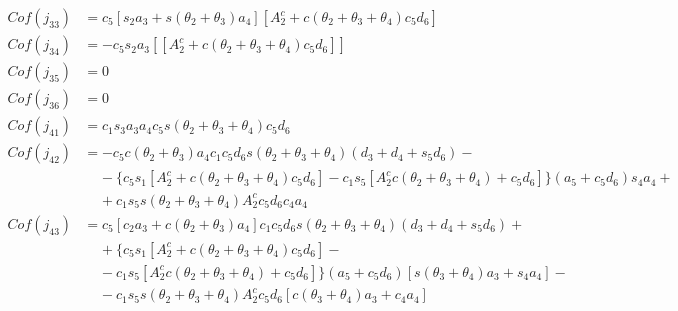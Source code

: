 \begin{align*}
    Cof(j_{33}) &= c_5[s_2a_3+s(\theta_2+\theta_3)a_4][A_2^c+c(\theta_2+\theta_3+\theta_4)c_5d_6] \\
    Cof(j_{34}) &= -c_5s_2a_3[[A_2^c+c(\theta_2+\theta_3+\theta_4)c_5d_6]] \\
    Cof(j_{35}) &= 0 \\
    Cof(j_{36}) &= 0 \\
    Cof(j_{41}) &= c_1s_3a_3a_4c_5s(\theta_2+\theta_3+\theta_4)c_5d_6 \\
    Cof(j_{42}) &= -c_5c(\theta_2+\theta_3)a_4c_1c_5d_6s(\theta_2+\theta_3+\theta_4)(d_3+d_4+s_5d_6)- \\
                    & \;\;\;\; -\!\{c_5s_1[A_2^c+c(\theta_2+\theta_3+\theta_4)c_5d_6]-c_1s_5[A_2^cc(\theta_2+\theta_3+\theta_4)+c_5d_6]\}(a_5+c_5d_6)s_4a_4+\\
                    & \;\;\;\; +\!c_1s_5s(\theta_2+\theta_3+\theta_4)A_2^cc_5d_6c_4a_4 \\
    Cof(j_{43}) &= c_5[c_2a_3+c(\theta_2+\theta_3)a_4]c_1c_5d_6s(\theta_2+\theta_3+\theta_4)(d_3+d_4+s_5d_6)+ \\
                    & \;\;\;\; +\!\{c_5s_1[A_2^c+c(\theta_2+\theta_3+\theta_4)c_5d_6]-\\
                    & \;\;\;\; -\!c_1s_5[A_2^cc(\theta_2+\theta_3+\theta_4)+c_5d_6]\}(a_5+c_5d_6)[s(\theta_3+\theta_4)a_3+s_4a_4]-\\
                    & \;\;\;\; -\!c_1s_5s(\theta_2+\theta_3+\theta_4)A_2^cc_5d_6[c(\theta_3+\theta_4)a_3+c_4a_4] \\    
\end{align*}

